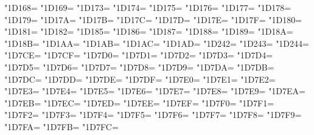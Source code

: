 \XeTeXcharclass"1D168=\KclassNum
\XeTeXcharclass"1D169=\KclassNum
\XeTeXcharclass"1D173=\KclassNum
\XeTeXcharclass"1D174=\KclassNum
\XeTeXcharclass"1D175=\KclassNum
\XeTeXcharclass"1D176=\KclassNum
\XeTeXcharclass"1D177=\KclassNum
\XeTeXcharclass"1D178=\KclassNum
\XeTeXcharclass"1D179=\KclassNum
\XeTeXcharclass"1D17A=\KclassNum
\XeTeXcharclass"1D17B=\KclassNum
\XeTeXcharclass"1D17C=\KclassNum
\XeTeXcharclass"1D17D=\KclassNum
\XeTeXcharclass"1D17E=\KclassNum
\XeTeXcharclass"1D17F=\KclassNum
\XeTeXcharclass"1D180=\KclassNum
\XeTeXcharclass"1D181=\KclassNum
\XeTeXcharclass"1D182=\KclassNum
\XeTeXcharclass"1D185=\KclassNum
\XeTeXcharclass"1D186=\KclassNum
\XeTeXcharclass"1D187=\KclassNum
\XeTeXcharclass"1D188=\KclassNum
\XeTeXcharclass"1D189=\KclassNum
\XeTeXcharclass"1D18A=\KclassNum
\XeTeXcharclass"1D18B=\KclassNum
\XeTeXcharclass"1D1AA=\KclassNum
\XeTeXcharclass"1D1AB=\KclassNum
\XeTeXcharclass"1D1AC=\KclassNum
\XeTeXcharclass"1D1AD=\KclassNum
\XeTeXcharclass"1D242=\KclassNum
\XeTeXcharclass"1D243=\KclassNum
\XeTeXcharclass"1D244=\KclassNum
\XeTeXcharclass"1D7CE=\KclassNum
\XeTeXcharclass"1D7CF=\KclassNum
\XeTeXcharclass"1D7D0=\KclassNum
\XeTeXcharclass"1D7D1=\KclassNum
\XeTeXcharclass"1D7D2=\KclassNum
\XeTeXcharclass"1D7D3=\KclassNum
\XeTeXcharclass"1D7D4=\KclassNum
\XeTeXcharclass"1D7D5=\KclassNum
\XeTeXcharclass"1D7D6=\KclassNum
\XeTeXcharclass"1D7D7=\KclassNum
\XeTeXcharclass"1D7D8=\KclassNum
\XeTeXcharclass"1D7D9=\KclassNum
\XeTeXcharclass"1D7DA=\KclassNum
\XeTeXcharclass"1D7DB=\KclassNum
\XeTeXcharclass"1D7DC=\KclassNum
\XeTeXcharclass"1D7DD=\KclassNum
\XeTeXcharclass"1D7DE=\KclassNum
\XeTeXcharclass"1D7DF=\KclassNum
\XeTeXcharclass"1D7E0=\KclassNum
\XeTeXcharclass"1D7E1=\KclassNum
\XeTeXcharclass"1D7E2=\KclassNum
\XeTeXcharclass"1D7E3=\KclassNum
\XeTeXcharclass"1D7E4=\KclassNum
\XeTeXcharclass"1D7E5=\KclassNum
\XeTeXcharclass"1D7E6=\KclassNum
\XeTeXcharclass"1D7E7=\KclassNum
\XeTeXcharclass"1D7E8=\KclassNum
\XeTeXcharclass"1D7E9=\KclassNum
\XeTeXcharclass"1D7EA=\KclassNum
\XeTeXcharclass"1D7EB=\KclassNum
\XeTeXcharclass"1D7EC=\KclassNum
\XeTeXcharclass"1D7ED=\KclassNum
\XeTeXcharclass"1D7EE=\KclassNum
\XeTeXcharclass"1D7EF=\KclassNum
\XeTeXcharclass"1D7F0=\KclassNum
\XeTeXcharclass"1D7F1=\KclassNum
\XeTeXcharclass"1D7F2=\KclassNum
\XeTeXcharclass"1D7F3=\KclassNum
\XeTeXcharclass"1D7F4=\KclassNum
\XeTeXcharclass"1D7F5=\KclassNum
\XeTeXcharclass"1D7F6=\KclassNum
\XeTeXcharclass"1D7F7=\KclassNum
\XeTeXcharclass"1D7F8=\KclassNum
\XeTeXcharclass"1D7F9=\KclassNum
\XeTeXcharclass"1D7FA=\KclassNum
\XeTeXcharclass"1D7FB=\KclassNum
\XeTeXcharclass"1D7FC=\KclassNum
